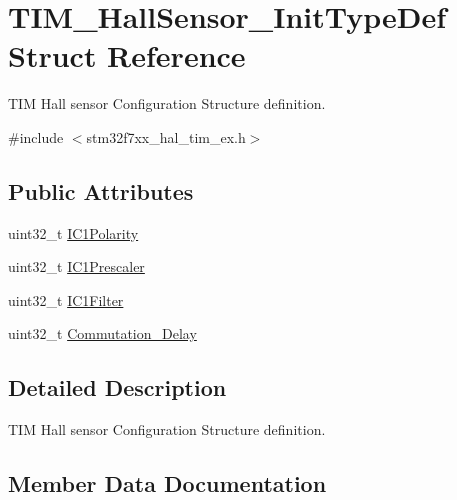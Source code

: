 \hypertarget{struct_t_i_m___hall_sensor___init_type_def}{}\section{T\+I\+M\+\_\+\+Hall\+Sensor\+\_\+\+Init\+Type\+Def Struct Reference}
\label{struct_t_i_m___hall_sensor___init_type_def}


T\+IM Hall sensor Configuration Structure definition.  




{\ttfamily \#include $<$stm32f7xx\+\_\+hal\+\_\+tim\+\_\+ex.\+h$>$}

\subsection*{Public Attributes}
\begin{DoxyCompactItemize}
\item 
uint32\+\_\+t \mbox{\hyperlink{struct_t_i_m___hall_sensor___init_type_def_a08e8f098cb51159344135bab57d82d85}{I\+C1\+Polarity}}
\item 
uint32\+\_\+t \mbox{\hyperlink{struct_t_i_m___hall_sensor___init_type_def_ac6c54e891cbe5afec92676219978209e}{I\+C1\+Prescaler}}
\item 
uint32\+\_\+t \mbox{\hyperlink{struct_t_i_m___hall_sensor___init_type_def_a2d349ca17282be59dd09dc9b10948d24}{I\+C1\+Filter}}
\item 
uint32\+\_\+t \mbox{\hyperlink{struct_t_i_m___hall_sensor___init_type_def_a822efefca8a13af284e84070bd19bb91}{Commutation\+\_\+\+Delay}}
\end{DoxyCompactItemize}


\subsection{Detailed Description}
T\+IM Hall sensor Configuration Structure definition. 

\subsection{Member Data Documentation}
\mbox{\label{struct_t_i_m___hall_sensor___init_type_def_a822efefca8a13af284e84070bd19bb91}} 

